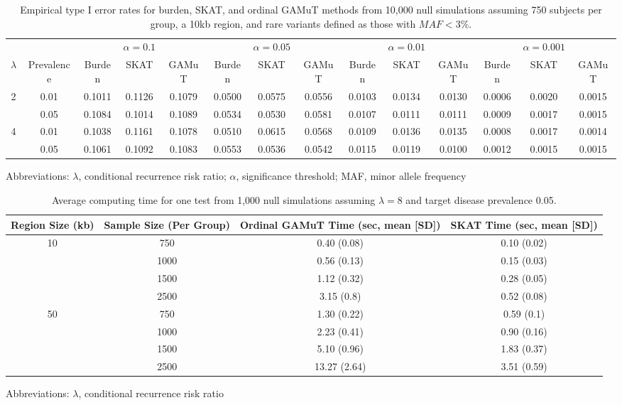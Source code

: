 \documentclass[]{article}
\begin{document}
\begin{table}[ht]
\centering
\footnotesize
\caption{Empirical type I error rates for burden, SKAT, and ordinal GAMuT methods from 10,000 null simulations assuming 750 subjects per group, a 10kb region, and rare variants defined as those with $MAF<3\%$.}
\vspace{0.25cm}
\begin{tabular}{c|c|ccc|ccc|ccc|ccc}
& & & $\alpha=0.1$ & & & $\alpha=0.05$ & & & $\alpha=0.01$ & & & $\alpha=0.001$ & \\
$\lambda$ & Prevalence & Burden & SKAT & GAMuT & Burden & SKAT & GAMuT & Burden & SKAT & GAMuT & Burden & SKAT & GAMuT \\
\hline
\multirow{2}{*}{2} & 0.01 & 0.1011 & 0.1126 & 0.1079 & 0.0500 & 0.0575 & 0.0556 & 0.0103 & 0.0134 & 0.0130 & 0.0006 & 0.0020 & 0.0015 \\
& 0.05 & 0.1084 & 0.1014 & 0.1089 & 0.0534 & 0.0530 & 0.0581 & 0.0107 & 0.0111 & 0.0111 & 0.0009 & 0.0017 & 0.0015 \\
\hline
\multirow{2}{*}{4} & 0.01 & 0.1038 & 0.1161 & 0.1078 & 0.0510 & 0.0615 & 0.0568 & 0.0109 & 0.0136 & 0.0135 & 0.0008 & 0.0017 & 0.0014 \\
& 0.05 & 0.1061 & 0.1092 & 0.1083 & 0.0553 & 0.0536 & 0.0542 & 0.0115 & 0.0119 & 0.0100 & 0.0012 & 0.0015 & 0.0015
\end{tabular}
\label{table1}
\vspace{0.2cm}
Abbreviations: $\lambda$, conditional recurrence risk ratio; $\alpha$, significance threshold; MAF, minor allele frequency
\end{table}

\begin{table}[ht]
\centering
\footnotesize
\caption{Average computing time for one test from 1,000 null simulations assuming $\lambda = 8$ and target disease prevalence 0.05.}
\vspace{0.25cm}
\begin{tabular}{c|c|c|c}
Region Size (kb) & Sample Size (Per Group) & Ordinal GAMuT Time (sec, mean [SD]) & SKAT Time (sec, mean [SD]) \\
\hline
\multirow{4}{*}{10} & 750 & 0.40 (0.08) & 0.10 (0.02)\\
& 1000 & 0.56 (0.13) & 0.15 (0.03) \\
& 1500 & 1.12 (0.32) & 0.28 (0.05) \\
& 2500 & 3.15 (0.8) & 0.52 (0.08)\\
\hline
\multirow{4}{*}{50} & 750 & 1.30 (0.22) & 0.59 (0.1) \\
& 1000 & 2.23 (0.41) & 0.90 (0.16) \\
& 1500 & 5.10 (0.96) & 1.83 (0.37) \\
& 2500 & 13.27 (2.64) & 3.51 (0.59)\\
\end{tabular}
\label{table2}

\vspace{0.2cm}
Abbreviations: $\lambda$, conditional recurrence risk ratio
\end{table}
\end{document}
